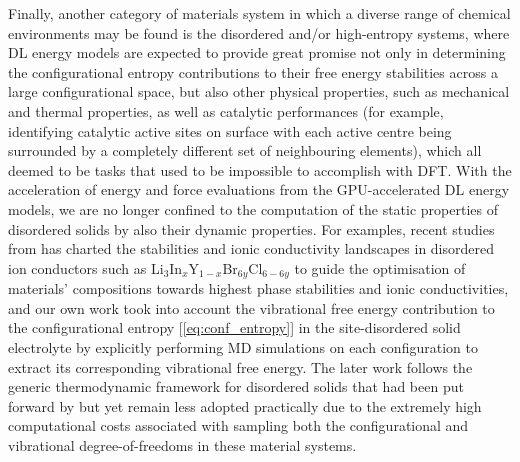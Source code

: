 Finally, another category of materials system in which a diverse range of chemical environments may be found is the disordered and/or high-entropy systems, where DL energy models are expected to provide great promise not only in determining the configurational entropy contributions to their free energy stabilities across a large configurational space, but also other physical properties, such as mechanical and thermal properties,\cite{dai2020theoretical,liu2025predicting} as well as catalytic performances\cite{zhai2022high} (for example, identifying catalytic active sites on surface with each active centre being surrounded by a completely different set of neighbouring elements), which all deemed to be tasks that used to be impossible to accomplish with DFT. With the acceleration of energy and force evaluations from the GPU-accelerated DL energy models, we are no longer confined to the computation of the static properties of disordered solids by also their dynamic properties. For examples, recent studies from \citet{deng2025accelerating} has charted the stabilities and ionic conductivity landscapes in disordered ion conductors such as Li$_{3}$In$_{x}$Y$_{1-x}$Br$_{6y}$Cl$_{6-6y}$ to guide the optimisation of materials' compositions towards highest phase stabilities and ionic conductivities, and our own work\cite{yang2025accounting} took into account the vibrational free energy contribution to the configurational entropy  [\cref{eq:conf_entropy}] in the site-disordered solid electrolyte  by explicitly performing MD simulations on each configuration to extract its corresponding vibrational free energy. The later work follows the generic thermodynamic framework for disordered solids that had been put forward by \citet{van2002effect} but yet remain less adopted practically due to the extremely high computational costs associated with sampling both the configurational and vibrational degree-of-freedoms in these material systems.

